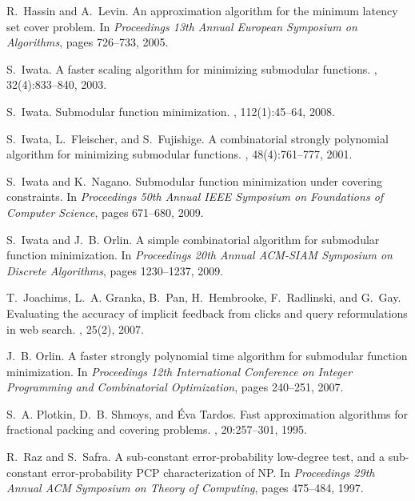 \documentclass[11pt]{article}
\theoremstyle{plain}
\theoremstyle{definition}
\begin{document}
\begin{thebibliography}{10}
R.~Hassin and A.~Levin.
\newblock An approximation algorithm for the minimum latency set cover problem.
\newblock In {\em Proceedings 13th Annual European Symposium on Algorithms},
  pages 726--733, 2005.

S.~Iwata.
\newblock A faster scaling algorithm for minimizing submodular functions.
, 32(4):833--840, 2003.

S.~Iwata.
\newblock Submodular function minimization.
, 112(1):45--64, 2008.

S.~Iwata, L.~Fleischer, and S.~Fujishige.
\newblock A combinatorial strongly polynomial algorithm for minimizing
  submodular functions.
, 48(4):761--777, 2001.

S.~Iwata and K.~Nagano.
\newblock Submodular function minimization under covering constraints.
\newblock In {\em Proceedings 50th Annual IEEE Symposium on Foundations of
  Computer Science}, pages 671--680, 2009.

S.~Iwata and J.~B. Orlin.
\newblock A simple combinatorial algorithm for submodular function
  minimization.
\newblock In {\em Proceedings 20th Annual ACM-SIAM Symposium on Discrete
  Algorithms}, pages 1230--1237, 2009.

T.~Joachims, L.~A. Granka, B.~Pan, H.~Hembrooke, F.~Radlinski, and
G.~Gay.
\newblock Evaluating the accuracy of implicit feedback from clicks and query
  reformulations in web search.
, 25(2), 2007.

J.~B. Orlin.
\newblock A faster strongly polynomial time algorithm for submodular function
  minimization.
\newblock In {\em Proceedings 12th International Conference on Integer
  Programming and Combinatorial Optimization}, pages 240--251, 2007.

S.~A. Plotkin, D.~B. Shmoys, and \'{E}va Tardos.
\newblock Fast approximation algorithms for fractional packing and covering
  problems.
, 20:257--301, 1995.

R.~Raz and S.~Safra.
\newblock A sub-constant error-probability low-degree test, and a sub-constant
  error-probability {PCP} characterization of {NP}.
\newblock In {\em Proceedings 29th Annual ACM Symposium on Theory of
  Computing}, pages 475--484, 1997.


\end{thebibliography}
\end{document}

